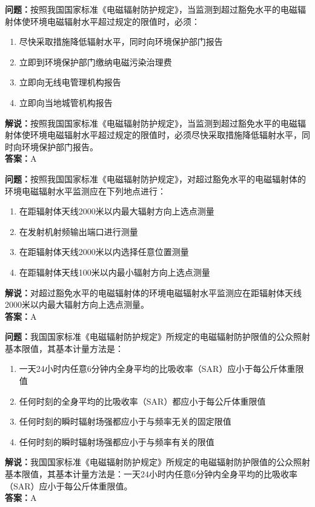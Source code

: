 \textbf{问题：}按照我国国家标准《电磁辐射防护规定》，当监测到超过豁免水平的电磁辐射体使环境电磁辐射水平超过规定的限值时，必须：
\begin{enumerate}[label=\Alph*), leftmargin=1cm]
	\item 尽快采取措施降低辐射水平，同时向环境保护部门报告
	\item 立即到环境保护部门缴纳电磁污染治理费
	\item 立即向无线电管理机构报告
	\item 立即向当地城管机构报告
\end{enumerate}
\textbf{解说：}按照我国国家标准《电磁辐射防护规定》，当监测到超过豁免水平的电磁辐射体使环境电磁辐射水平超过规定的限值时，必须尽快采取措施降低辐射水平，同时向环境保护部门报告。\\
\textbf{答案：}A

\textbf{问题：}按照我国国家标准《电磁辐射防护规定》，对超过豁免水平的电磁辐射体的环境电磁辐射水平监测应在下列地点进行：
\begin{enumerate}[label=\Alph*), leftmargin=1cm]
	\item 在距辐射体天线2000米以内最大辐射方向上选点测量
	\item 在发射机射频输出端口进行测量
	\item 在距辐射体天线2000米以内选择任意位置测量
	\item 在距辐射体天线100米以内最小辐射方向上选点测量
\end{enumerate}
\textbf{解说：}对超过豁免水平的电磁辐射体的环境电磁辐射水平监测应在距辐射体天线2000米以内最大辐射方向上选点测量。\\
\textbf{答案：}A

\textbf{问题：}我国国家标准《电磁辐射防护规定》所规定的电磁辐射防护限值的公众照射基本限值，其基本计量方法是：
\begin{enumerate}[label=\Alph*), leftmargin=1cm]
	\item 一天24小时内任意6分钟内全身平均的比吸收率（SAR）应小于每公斤体重限值
	\item 任何时刻的全身平均的比吸收率（SAR）都应小于每公斤体重限值
	\item 任何时刻的瞬时辐射场强都应小于与频率无关的固定限值
	\item 任何时刻的瞬时辐射场强都应小于与频率有关的限值
\end{enumerate}
\textbf{解说：}我国国家标准《电磁辐射防护规定》所规定的电磁辐射防护限值的公众照射基本限值，其基本计量方法是：一天24小时内任意6分钟内全身平均的比吸收率（SAR）应小于每公斤体重限值。\\
\textbf{答案：}A


